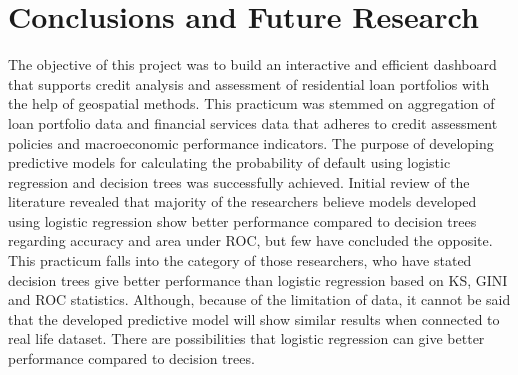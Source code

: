 %
%
%
%

\chapter{Conclusions and Future Research}\label{C.Conclusions.Future.research}

The objective of this project was to build an interactive and efficient dashboard that supports credit analysis and assessment of residential loan portfolios with the help of geospatial methods. This practicum was stemmed on aggregation of loan portfolio data and financial services data that adheres to credit assessment policies and macroeconomic performance indicators. The purpose of developing predictive models for calculating the probability of default using logistic regression and decision trees was successfully achieved.  Initial review of the literature revealed that majority of the researchers believe models developed using logistic regression show better performance compared to decision trees regarding accuracy and area under ROC, but few have concluded the opposite. This practicum falls into the category of those researchers, who have stated decision trees give better performance than logistic regression based on KS, GINI and ROC statistics.  Although, because of the limitation of data, it cannot be said that the developed predictive model will show similar results when connected to real life dataset. There are possibilities that logistic regression can give better performance compared to decision trees.

